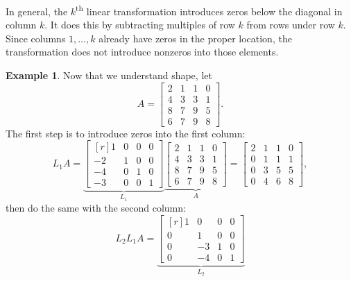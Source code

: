 \documentclass[12pt,letterpaper,DIV=11]{scrartcl}
\theoremstyle{plain}
\theoremstyle{definition}
\newtheorem{example}{Example}[section]
\theoremstyle{remark}
\begin{document}
In general, the $k$\textsuperscript{th} linear transformation introduces zeros below the diagonal in column $k$.
It does this by subtracting multiples of row $k$ from rows under row $k$.
Since columns $1, \dots, k$ already have zeros in the proper location, the transformation does not introduce nonzeros into those elements.

\begin{example}
  Now that we understand shape, let \begin{displaymath}
    A = \begin{bmatrix}
      2 & 1 & 1 & 0 \\
      4 & 3 & 3 & 1 \\
      8 & 7 & 9 & 5 \\
      6 & 7 & 9 & 8
    \end{bmatrix}.
  \end{displaymath}
  The first step is to introduce zeros into the first column: \begin{displaymath}
    L_1 A = \underbrace{\begin{bmatrix*}[r]
        1 & 0 & 0 & 0 \\
        -2 & 1 & 0 & 0 \\
        -4 & 0 & 1 & 0 \\
        -3 & 0 & 0 & 1
    \end{bmatrix*}}_{L_1}
    \underbrace{\begin{bmatrix}
        2 & 1 & 1 & 0 \\
        4 & 3 & 3 & 1 \\
        8 & 7 & 9 & 5 \\
        6 & 7 & 9 & 8
    \end{bmatrix}}_A =
    \begin{bmatrix}
      2 & 1 & 1 & 0 \\
      0 & 1 & 1 & 1 \\
      0 & 3 & 5 & 5 \\
      0 & 4 & 6 & 8
    \end{bmatrix},
  \end{displaymath}
  then do the same with the second column: \begin{displaymath}
    L_2 L_1 A = \underbrace{\begin{bmatrix*}[r]
        1 & 0 & 0 & 0 \\
        0 & 1 & 0 & 0 \\
        0 & -3 & 1 & 0 \\
        0 & -4 & 0 & 1
    \end{bmatrix*}}_{L_2}

\end{displaymath}
\end{example}
\end{document}
